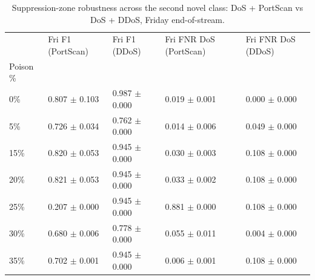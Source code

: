 \begin{table}
\caption{Suppression-zone robustness across the second novel class: DoS + PortScan vs DoS + DDoS, Friday end-of-stream.}
\label{tab:class-variant}
\begin{tabular}{lllll}
\toprule
 & Fri F1 (PortScan) & Fri F1 (DDoS) & Fri FNR DoS (PortScan) & Fri FNR DoS (DDoS) \\
Poison \% &  &  &  &  \\
\midrule
0\% & 0.807 $\pm$ 0.103 & 0.987 $\pm$ 0.000 & 0.019 $\pm$ 0.001 & 0.000 $\pm$ 0.000 \\
5\% & 0.726 $\pm$ 0.034 & 0.762 $\pm$ 0.000 & 0.014 $\pm$ 0.006 & 0.049 $\pm$ 0.000 \\
15\% & 0.820 $\pm$ 0.053 & 0.945 $\pm$ 0.000 & 0.030 $\pm$ 0.003 & 0.108 $\pm$ 0.000 \\
20\% & 0.821 $\pm$ 0.053 & 0.945 $\pm$ 0.000 & 0.033 $\pm$ 0.002 & 0.108 $\pm$ 0.000 \\
25\% & 0.207 $\pm$ 0.000 & 0.945 $\pm$ 0.000 & 0.881 $\pm$ 0.000 & 0.108 $\pm$ 0.000 \\
30\% & 0.680 $\pm$ 0.006 & 0.778 $\pm$ 0.000 & 0.055 $\pm$ 0.011 & 0.004 $\pm$ 0.000 \\
35\% & 0.702 $\pm$ 0.001 & 0.945 $\pm$ 0.000 & 0.006 $\pm$ 0.001 & 0.108 $\pm$ 0.000 \\
\bottomrule
\end{tabular}
\end{table}
